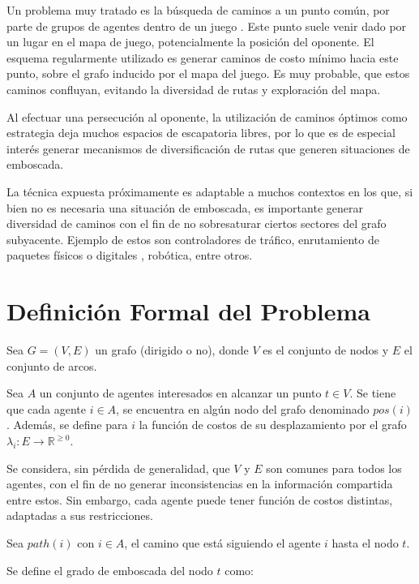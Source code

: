 \documentclass{egpubl}
\begin{document}
Un problema muy tratado es la búsqueda de caminos a un punto común,
por parte de grupos de agentes dentro de un juego \cite{MF09}. Este punto suele
venir dado por un lugar en el mapa de juego, potencialmente la
posición del oponente.
El esquema regularmente utilizado es generar caminos de costo mínimo
\cite{HNR72} \cite{RN93}
hacia este punto, sobre el grafo inducido por el mapa del juego. Es
muy probable, que estos caminos confluyan, evitando la diversidad de
rutas y exploración del mapa.

Al efectuar una persecución al oponente, la utilización de caminos
óptimos como estrategia deja muchos espacios de escapatoria libres,
por lo que es de especial interés generar mecanismos de diversificación de
rutas que generen situaciones de emboscada.

La técnica expuesta próximamente es adaptable a muchos contextos en
los que, si bien no es necesaria una situación de emboscada, es
importante generar diversidad de caminos con el fin de no sobresaturar
ciertos sectores del grafo subyacente. Ejemplo de estos son controladores
de tráfico, enrutamiento de paquetes físicos o digitales \cite{TMSV03},
robótica, entre otros.


\section{Definición Formal del Problema}

Sea $G = (V,E)$ un grafo (dirigido o no), donde
$V$ es el conjunto de nodos y $E$
el conjunto de arcos.

Sea $A$ un conjunto de agentes
interesados en alcanzar un punto $t \in V$. Se tiene
que cada agente $i \in A$, se encuentra en algún nodo del grafo
denominado $pos(i)$. Además, se define para $i$ la función
de costos de su desplazamiento por el grafo
$\lambda_i : E \longrightarrow \mathbb{R}^{\geq 0}$.

Se considera, sin pérdida de generalidad, que $V$ y $E$ son comunes para
todos los agentes, con el fin de no generar inconsistencias en la
información compartida entre estos. Sin embargo, cada agente puede tener
función de costos distintas, adaptadas a sus restricciones.

Sea $path(i)$ con $i \in A$, el camino que está siguiendo el agente
$i$ hasta el nodo $t$.

Se define el grado de emboscada del nodo $t$ como:
\end{document}
